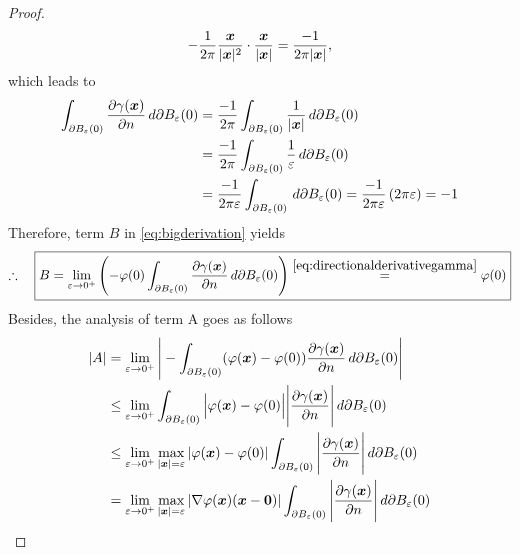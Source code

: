 \documentclass[12pt]{article}
\begin{document}
\begin{proof}
\begin{align}
		-\frac{1}{2\pi}\frac{{\boldsymbol{\mathnormal x}}}{|{\boldsymbol{\mathnormal x}}|^2} \cdot\frac{{\boldsymbol{\mathnormal x}}}{|{\boldsymbol{\mathnormal x}}|}=\frac{-1}{2\pi|{\boldsymbol{\mathnormal x}}|},
	\end{align}
	which leads to
	\begin{align}
		\label{eq:directionalderivativegamma}
		\int_{\partial B_\varepsilon(0)}
		\frac{\partial\gamma({\boldsymbol{\mathnormal x}})}{\partial n}\, d\partial B_\varepsilon(0)
		 & = \frac{-1}{2\pi}
		\int_{\partial B_\varepsilon(0)}\frac{1}{|{\boldsymbol{\mathnormal x}}|}\, d\partial B_\varepsilon(0)       \notag \\
		 & = \frac{-1}{2\pi}
		\int_{\partial B_\varepsilon(0)}\frac{1}{\varepsilon}\, d\partial B_\varepsilon(0) \notag \\
		 & = \frac{-1}{2\pi\varepsilon}
		\int_{\partial B_\varepsilon(0)}\, d\partial B_\varepsilon(0)
		= \frac{-1}{2\pi\varepsilon} \left( 2\pi \varepsilon \right)
		= -1
	\end{align}
	Therefore, term $B$ in \eqref{eq:bigderivation} yields 
	\begin{align}
		\label{eq:TermBfinal}
		\therefore\quad
		\boxed{
			B = \lim_{\varepsilon\to 0^+}
			\left(
			-\varphi(0)\int_{\partial B_\varepsilon(0)}
			\frac{\partial\gamma({\boldsymbol{\mathnormal x}})}{\partial n}\, d\partial B_{\varepsilon}(0) \right) 
			\stackrel{\eqref{eq:directionalderivativegamma}}{=} \varphi(0)
		}
	\end{align}
	Besides, the analysis of term A goes as follows
	\begin{align}
		|A| & = \lim_{\varepsilon\to 0^+}
		\Bigg|
		- \int_{\partial B_\varepsilon(0)} (\varphi(\Bx)-\varphi(0))
		\frac{\partial\gamma(\Bx)}{\partial n}\, d\partial B_\varepsilon(0)
		\Bigg|                                                                                       \notag \\
		    & \leq \lim_{\varepsilon\to 0^+}
		\int_{\partial B_\varepsilon(0)}
		\Big|\varphi(\Bx)-\varphi(0)\Big|
		\Bigg|\frac{\partial\gamma(\Bx)}{\partial n}\Bigg|
		\, d\partial B_\varepsilon(0)                                                                \notag \\
		    & \leq  
		\lim_{\varepsilon\to 0^+}
		\max_{|\Bx|=\varepsilon}{|\varphi(\Bx)-\varphi(0)|}
		\int_{\partial B_\varepsilon(0)}
		\Bigg|\frac{\partial\gamma(\Bx)}{\partial n}\Bigg|\, d\partial B_\varepsilon(0)              \notag \\
		    & =
		\lim_{\varepsilon\to 0^+}
		\max_{|\Bx|=\varepsilon}{|\nabla\varphi(\Bx) (\Bx - \mathbf{0})|}
		\int_{\partial B_\varepsilon(0)}
		\Bigg|\frac{\partial\gamma(\Bx)}{\partial n}\Bigg|\, d\partial B_\varepsilon(0)              \notag \\

\end{align}
\end{proof}
\end{document}
